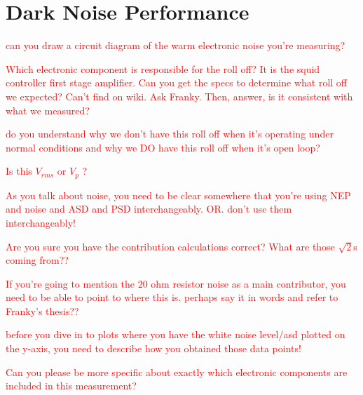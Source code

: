 


\section{Dark Noise Performance}
\label{sec:dark_noise}

\textcolor{red}{can you draw a circuit diagram of the warm electronic noise you're measuring?}

\textcolor{red}{Which electronic component is responsible for the roll off? It is the squid controller first stage amplifier. Can you get the specs to determine what roll off we expected? Can't find on wiki. Ask Franky. Then, answer, is it consistent with what we measured?}

\textcolor{red}{do you understand why we don't have this roll off when it's operating under normal conditions and why we DO have this roll off when it's open loop?}

\textcolor{red}{Is this $V_{rms}$ or $V_{p}$ ?}

\textcolor{red}{As you talk about noise, you need to be clear somewhere that you're using NEP and noise and ASD and PSD interchangeably. OR. don't use them interchangeably!}

\textcolor{red}{Are you sure you have the contribution calculations correct? What are those $\sqrt{2}$s coming from??}

\textcolor{red}{If you're going to mention the 20 ohm resistor noise as a main contributor, you need to be able to point to where this is. perhaps say it in words and refer to Franky's thesis??}

\textcolor{red}{before you dive in to plots where you have the white noise level/asd plotted on the y-axis, you need to describe how you obtained those data points!}

\textcolor{red}{Can you please be more specific about exactly which electronic components are included in this measurement?}


